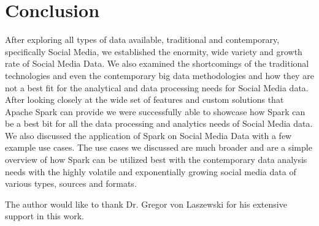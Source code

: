 \documentclass[sigconf]{acmart}
\begin{document}
\section{Conclusion}
After exploring all types of data available, traditional and contemporary, specifically Social Media, we established the enormity, wide variety and growth rate of Social Media Data. We also examined the shortcomings of the traditional technologies and even the contemporary big data methodologies and how they are not a best fit for the analytical and data processing needs for Social Media data. After looking closely at the wide set of features and custom solutions that Apache Spark can provide we were successfully able to showcase how Spark can be a best bit for all the data processing and analytics needs of Social Media data. We also discussed the application of Spark on Social Media Data with a few example use cases. The use cases we discussed are much broader and are a simple overview of how Spark can be utilized best with the contemporary data analysis needs with the highly volatile and exponentially growing social media data of various types, sources and formats.
\begin{acks}
The author would like to thank Dr. Gregor von Laszewski for his extensive support in this work.
\end{acks}

 
\end{document}
